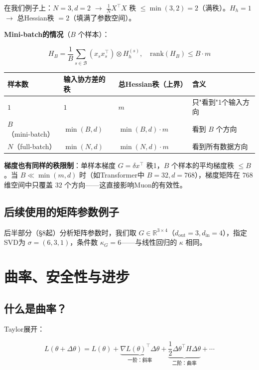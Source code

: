 \documentclass[12pt,a4paper]{article}
\begin{document}
在我们例子上：$N=3, d=2$ $\to$ $\frac{1}{N}X^\top X$ 秩 $\le \min(3,2) = 2$（满秩）。$H_h = 1$ $\to$ 总Hessian秩 $= 2$（填满了参数空间）。

\textbf{Mini-batch的情况}（$B$ 个样本）：

\[H_B = \frac{1}{B}\sum_{s \in \mathcal{B}} (x_s x_s^\top) \otimes H_h^{(s)}, \quad \text{rank}(H_B) \le B \cdot m\]

\begin{center}\small
\begin{longtable}{|l|l|l|l|}
\hline
样本数 & 输入协方差的秩 & 总Hessian秩（上界） & 含义 \\
\hline
$1$ & $1$ & $m$ & 只"看到"1个输入方向 \\
$B$（mini-batch） & $\min(B, d)$ & $\min(B, d) \cdot m$ & 看到 $B$ 个方向 \\
$N$（full-batch） & $\min(N, d)$ & $\min(N, d) \cdot m$ & 看到所有数据方向 \\
\hline
\end{longtable}
\end{center}

\textbf{梯度也有同样的秩限制}：单样本梯度 $G = \delta x^\top$ 秩1，$B$ 个样本的平均梯度秩 $\le B$。当 $B \ll \min(m, d)$ 时（如Transformer中 $B=32, d=768$），梯度矩阵在 $768$ 维空间中只覆盖 $32$ 个方向——这直接影响Muon的有效性。

\subsection{后续使用的矩阵参数例子}

后半部分（§8起）分析矩阵参数时，我们取 $G \in \mathbb{R}^{3 \times 4}$（$d_{\text{out}}=3, d_{\text{in}}=4$），指定SVD为 $\sigma = (6, 3, 1)$，条件数 $\kappa_G = 6$——与线性回归的 $\kappa$ 相同。


\section{曲率、安全性与进步}


\subsection{什么是曲率？}

Taylor展开：


\[L(\theta + \Delta\theta) = L(\theta) + \underbrace{\nabla L(\theta)^\top \Delta\theta}_{\text{一阶：斜率}} + \underbrace{\frac{1}{2}\Delta\theta^\top H \Delta\theta}_{\text{二阶：曲率}} + \cdots\]
\end{document}
